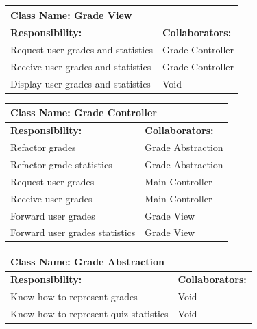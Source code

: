 \documentclass[]{article}
\begin{document}
	\begin{table}[H]
	\centering
		\begin{tabular}{|p{9cm}|p{3cm}|}
		\hline
		 \multicolumn{2}{|l|}{\textbf{Class Name: Grade View}} \\
		\hline
		\textbf{Responsibility:} & \textbf{Collaborators:} \\
		\hline
		Request user grades and statistics & Grade Controller\\
		\hline
	    Receive user grades and statistics & Grade Controller\\
	    \hline
	    Display user grades and statistics& Void\\
	    \hline 
		\end{tabular}
	\end{table}
	
	\begin{table}[H]
	\centering
		\begin{tabular}{|p{9cm}|p{3cm}|}
		\hline
		 \multicolumn{2}{|l|}{\textbf{Class Name: Grade Controller}} \\
		\hline
		\textbf{Responsibility:} & \textbf{Collaborators:} \\
		\hline
	    Refactor grades & Grade Abstraction\\
		\hline
		Refactor grade statistics & Grade Abstraction\\
		\hline
	    Request user grades & Main Controller\\
		\hline
		Receive user grades & Main Controller\\
		\hline
		Forward user grades & Grade View\\
		\hline
		Forward user grades statistics & Grade View\\
		\hline
		\end{tabular}
	\end{table}
	
	\begin{table}[H]
	\centering
		\begin{tabular}{|p{9cm}|p{3cm}|}
		\hline
		 \multicolumn{2}{|l|}{\textbf{Class Name: Grade Abstraction}} \\
		\hline
		\textbf{Responsibility:} & \textbf{Collaborators:} \\
		\hline
	    Know how to represent grades  & Void\\
		\hline
		Know how to represent quiz statistics & Void\\
		\hline
		\end{tabular}
	\end{table}
\end{document}
